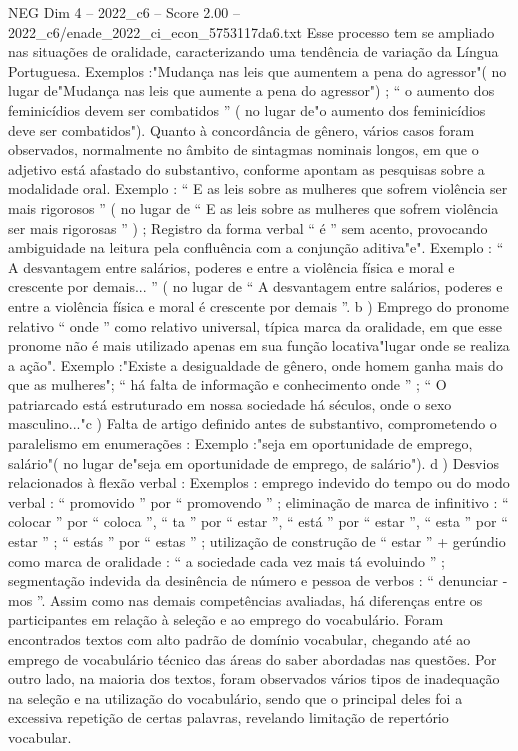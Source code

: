 \begin{textsample}{NEG Dim 4 – 2022\_c6 – Score 2.00 – 2022\_c6/enade\_2022\_ci\_econ\_5753117da6.txt}
Esse processo tem se ampliado nas situações de oralidade, caracterizando uma tendência de variação da Língua Portuguesa.
Exemplos :"Mudança nas leis que aumentem a pena do agressor"( no lugar de"Mudança nas leis que aumente a pena do agressor") ; “ o aumento dos feminicídios devem ser combatidos ” ( no lugar de"o aumento dos feminicídios deve ser combatidos").
Quanto à concordância de gênero, vários casos foram observados, normalmente no âmbito de sintagmas nominais longos, em que o adjetivo está afastado do substantivo, conforme apontam as pesquisas sobre a modalidade oral.
Exemplo : “ E as leis sobre as mulheres que sofrem violência ser mais rigorosos ” ( no lugar de “ E as leis sobre as mulheres que sofrem violência ser mais rigorosas ” ) ; Registro da forma verbal “ é ” sem acento, provocando ambiguidade na leitura pela confluência com a conjunção aditiva"e".
Exemplo : “ A desvantagem entre salários, poderes e entre a violência física e moral e crescente por demais... ” ( no lugar de “ A desvantagem entre salários, poderes e entre a violência física e moral é crescente por demais ”. b ) Emprego do pronome relativo “ onde ” como relativo universal, típica marca da oralidade, em que esse pronome não é mais utilizado apenas em sua função locativa"lugar onde se realiza a ação".
Exemplo :"Existe a desigualdade de gênero, onde homem ganha mais do que as mulheres"; “ há falta de informação e conhecimento onde ” ; “ O patriarcado está estruturado em nossa sociedade há séculos, onde o sexo masculino..."c ) Falta de artigo definido antes de substantivo, comprometendo o paralelismo em enumerações : Exemplo :"seja em oportunidade de emprego, salário"( no lugar de"seja em oportunidade de emprego, de salário"). d ) Desvios relacionados à flexão verbal : Exemplos : emprego indevido do tempo ou do modo verbal : “ promovido ” por “ promovendo ” ; eliminação de marca de infinitivo : “ colocar ” por “ coloca ”, “ ta ” por “ estar ”, “ está ” por “ estar ”, “ esta ” por “ estar ” ; “ estás ” por “ estas ” ; utilização de construção de “ estar ” + gerúndio como marca de oralidade : “ a sociedade cada vez mais tá evoluindo ” ; segmentação indevida da desinência de número e pessoa de verbos : “ denunciar -mos ”.
Assim como nas demais competências avaliadas, há diferenças entre os participantes em relação à seleção e ao emprego do vocabulário.
Foram encontrados textos com alto padrão de domínio vocabular, chegando até ao emprego de vocabulário técnico das áreas do saber abordadas nas questões.
Por outro lado, na maioria dos textos, foram observados vários tipos de inadequação na seleção e na utilização do vocabulário, sendo que o principal deles foi a excessiva repetição de certas palavras, revelando limitação de repertório vocabular.

\end{textsample}
